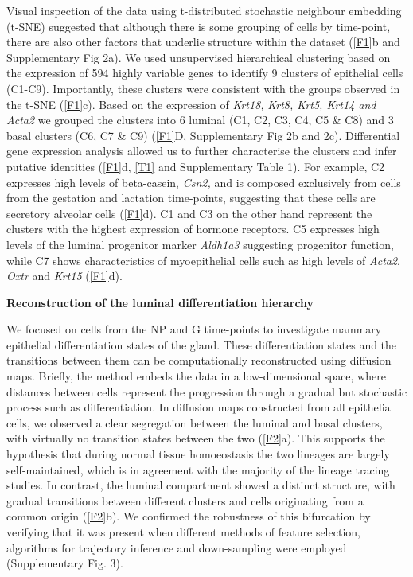\documentclass[titlepage, 12pt, oneside]{amsart}
\begin{document}
Visual inspection of the data using t-distributed stochastic neighbour embedding (t-SNE) suggested that although there is some grouping of cells by time-point, there are also other factors that underlie structure within the dataset (\autoref{F1}b and Supplementary Fig 2a).
We used unsupervised hierarchical clustering based on the expression of 594 highly variable genes to identify 9 clusters of epithelial cells (C1-C9).
Importantly, these clusters were consistent with the groups observed in the t-SNE (\autoref{F1}c).
Based on the expression of \textit{Krt18,} \textit{Krt8, Krt5, Krt14 and Acta2} we grouped the clusters into 6 luminal (C1, C2, C3, C4, C5 \& C8) and 3 basal clusters (C6, C7 \& C9) (\autoref{F1}D, Supplementary Fig 2b and 2c).
Differential gene expression analysis allowed us to further characterise the clusters and infer putative identities (\autoref{F1}d, \autoref{T1} and Supplementary Table 1).
For example, C2 expresses high levels of beta-casein, \textit{Csn2,} and is composed exclusively from cells from the gestation and lactation time-points, suggesting that these cells are secretory alveolar cells (\autoref{F1}d).
C1 and C3 on the other hand represent the clusters with the highest expression of hormone receptors.
C5 expresses high levels of the luminal progenitor marker \textit{Aldh1a3} suggesting progenitor function, while C7 shows characteristics of myoepithelial cells such as high levels of \textit{Acta2}, \textit{Oxtr} and \textit{Krt15} (\autoref{F1}d).

\textbf{Reconstruction of the luminal differentiation hierarchy}

We focused on cells from the NP and G time-points to investigate mammary epithelial differentiation states of the gland.
These differentiation states and the transitions between them can be computationally reconstructed using diffusion maps.
Briefly, the method embeds the data in a low-dimensional space, where distances between cells represent the progression through a gradual but stochastic process such as differentiation.
In diffusion maps constructed from all epithelial cells, we observed a clear segregation between the luminal and basal clusters, with virtually no transition states between the two (\autoref{F2}a).
This supports the hypothesis that during normal tissue homoeostasis the two lineages are largely self-maintained, which is in agreement with the majority of the lineage tracing studies\autocite{VanKeymeulen2011,VanAmerongen2012,Davis2016}.
In contrast, the luminal compartment showed a distinct structure, with gradual transitions between different clusters and cells originating from a common origin (\autoref{F2}b).
We confirmed the robustness of this bifurcation by verifying that it was present when different methods of feature selection, algorithms for trajectory inference and down-sampling were employed (Supplementary Fig. 3).
\end{document}
